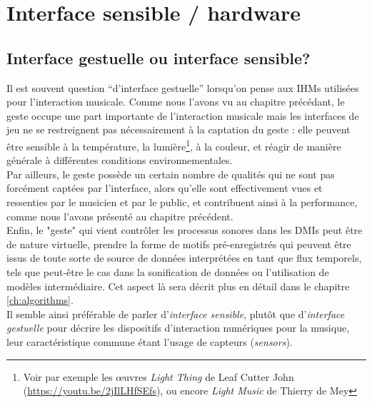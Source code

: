 %
\chapter{Interface sensible / hardware}
\label{ch:interfaces}



\section{Interface gestuelle ou interface sensible?}

\noindent Il est souvent question ``d'interface gestuelle'' lorsqu'on pense aux \glspl{IHM} utilisées pour l'interaction musicale. Comme nous l'avons vu au chapitre précédant, le geste occupe une part importante de l'interaction musicale mais les interfaces de jeu ne se restreignent pas nécessairement à la captation du geste : elle peuvent être sensible à la température, la lumière\footnote{Voir par exemple les œuvres \textit{Light Thing} de Leaf Cutter John (\url{https://youtu.be/2jIlLHfSEfs}), ou encore \textit{Light Music} de Thierry de Mey}, à la couleur, et réagir de manière générale à différentes conditions environnementales.\\
\indent Par ailleurs, le geste possède un certain nombre de qualités qui ne sont pas forcément captées par l'interface, alors qu'elle sont effectivement vues et ressenties par le musicien et par le public, et contribuent ainsi à la performance, comme nous l'avons présenté au chapitre précédent.\\
\indent Enfin, le "geste" qui vient contrôler les processus sonores dans les \glspl{DMI} peut être de nature virtuelle, prendre la forme de motifs pré-enregistrés qui peuvent être issus de toute sorte de source de données interprétées en tant que flux temporels, tels que peut-être le cas dans la sonification de données ou l'utilisation de modèles intermédiaire. Cet aspect là sera décrit plus en détail dans le chapitre \ref{ch:algorithms}.\\
\indent Il semble ainsi préférable de parler d'\textit{interface sensible}, plutôt que d'\textit{interface gestuelle} pour décrire les dispositifs d'interaction numériques pour la musique, leur caractéristique commune étant l'usage de capteurs (\textit{sensors}).



